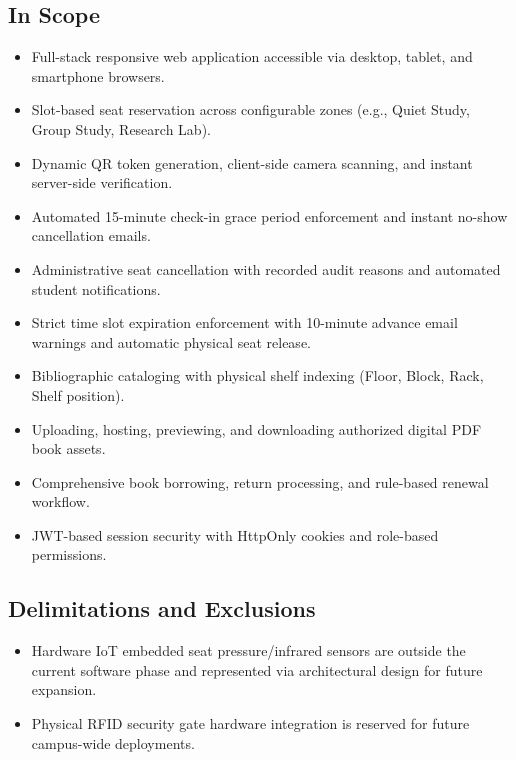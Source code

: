 \subsection{In Scope}
\begin{itemize}
    \item Full-stack responsive web application accessible via desktop, tablet, and smartphone browsers.
    \item Slot-based seat reservation across configurable zones (e.g., Quiet Study, Group Study, Research Lab).
    \item Dynamic QR token generation, client-side camera scanning, and instant server-side verification.
    \item Automated 15-minute check-in grace period enforcement and instant no-show cancellation emails.
    \item Administrative seat cancellation with recorded audit reasons and automated student notifications.
    \item Strict time slot expiration enforcement with 10-minute advance email warnings and automatic physical seat release.
    \item Bibliographic cataloging with physical shelf indexing (Floor, Block, Rack, Shelf position).
    \item Uploading, hosting, previewing, and downloading authorized digital PDF book assets.
    \item Comprehensive book borrowing, return processing, and rule-based renewal workflow.
    \item JWT-based session security with HttpOnly cookies and role-based permissions.
\end{itemize}

\subsection{Delimitations and Exclusions}
\begin{itemize}
    \item Hardware IoT embedded seat pressure/infrared sensors are outside the current software phase and represented via architectural design for future expansion.
    \item Physical RFID security gate hardware integration is reserved for future campus-wide deployments.
\end{itemize}


